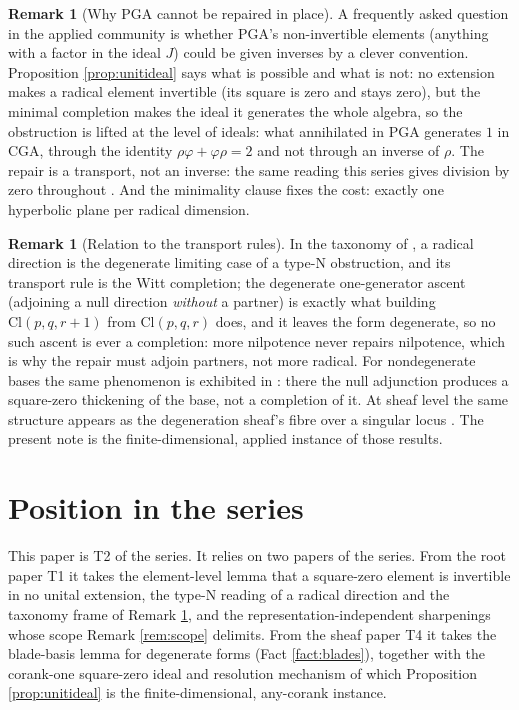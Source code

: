 \documentclass[11pt]{article}
\theoremstyle{definition}
\newtheorem{remark}[theorem]{Remark}
\newcommand{\Cl}{\mathrm{Cl}}
\begin{document}
\begin{remark}[Why PGA cannot be repaired in place]\label{rem:inplace}
A frequently asked question in the applied community is whether PGA's non-invertible elements (anything with a factor in the ideal $J$) could be given inverses by a clever convention. Proposition \ref{prop:unitideal} says what is possible and what is not: no extension makes a radical element invertible (its square is zero and stays zero), but the minimal completion makes the ideal it generates the whole algebra, so the obstruction is lifted at the level of ideals: what annihilated in PGA generates $1$ in CGA, through the identity $\rho\varphi + \varphi\rho = 2$ and not through an inverse of $\rho$. The repair is a transport, not an inverse: the same reading this series gives division by zero throughout \cite{ButlerT1}. And the minimality clause fixes the cost: exactly one hyperbolic plane per radical dimension.
\end{remark}

\begin{remark}[Relation to the transport rules]\label{rem:taxonomy}
In the taxonomy of \cite{ButlerT1}, a radical direction is the degenerate limiting case of a type-N obstruction, and its transport rule is the Witt completion; the degenerate one-generator ascent (adjoining a null direction \emph{without} a partner) is exactly what building $\Cl(p,q,r{+}1)$ from $\Cl(p,q,r)$ does, and it leaves the form degenerate, so no such ascent is ever a completion: more nilpotence never repairs nilpotence, which is why the repair must adjoin partners, not more radical. For nondegenerate bases the same phenomenon is exhibited in \cite[Thm.~5.7]{ButlerT1}: there the null adjunction produces a square-zero thickening of the base, not a completion of it. At sheaf level the same structure appears as the degeneration sheaf's fibre over a singular locus \cite[Thm.~3.1]{ButlerT4}. The present note is the finite-dimensional, applied instance of those results.
\end{remark}

\section{Position in the series}\label{sec:position}

This paper is T2 of the series. It relies on two papers of the series. From the root paper T1 \cite{ButlerT1} it takes the element-level lemma that a square-zero element is invertible in no unital extension, the type-N reading of a radical direction and the taxonomy frame of Remark \ref{rem:taxonomy}, and the representation-independent sharpenings whose scope Remark \ref{rem:scope} delimits. From the sheaf paper T4 \cite{ButlerT4} it takes the blade-basis lemma for degenerate forms (Fact \ref{fact:blades}), together with the corank-one square-zero ideal and resolution mechanism of which Proposition \ref{prop:unitideal} is the finite-dimensional, any-corank instance.
\end{document}

